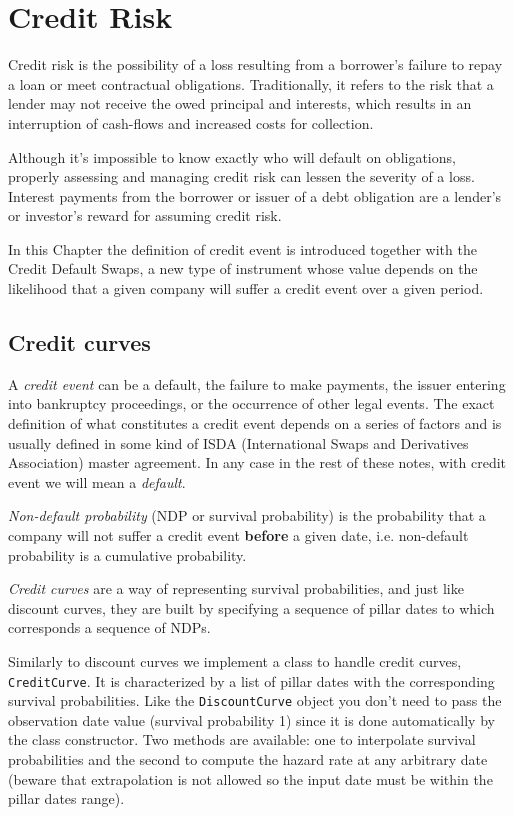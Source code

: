 \chapter{Credit Risk}\label{credit_default_swaps}

Credit risk is the possibility of a loss resulting from a borrower's failure to repay a loan or meet contractual obligations. Traditionally, it refers to the risk that a lender may not receive the owed principal and interests, which results in an interruption of cash-flows and increased costs for collection. 

Although it's impossible to know exactly who will default on obligations, properly assessing and managing credit risk can lessen the severity of a loss. Interest payments from the borrower or issuer of a debt obligation are a lender's or investor's reward for assuming credit risk.

In this Chapter the definition of credit event is introduced together with the Credit Default Swaps, a new type of instrument whose value depends on the likelihood that a given company will suffer a credit event over a given period.

\section{Credit curves}
\label{credit-curves}

A \emph{credit event} can be a default, the failure to make payments, the issuer entering into bankruptcy proceedings, or the occurrence of other legal events. The exact definition of what constitutes a credit event depends on a series of factors and is usually defined in some kind of ISDA (International Swaps and Derivatives Association) master agreement. In any case in the rest of these notes, with credit event we will mean a \emph{default}.

\emph{Non-default probability} (NDP or survival probability) is the probability that a company will not suffer a credit event \textbf{before} a given date, i.e. non-default probability is a cumulative probability.

\emph{Credit curves} are a way of representing survival probabilities, and just like discount curves, they are built by specifying a sequence of pillar dates to which corresponds a sequence of NDPs. 

\begin{finmarkets}
	Similarly to discount curves we implement a class to handle credit curves, \texttt{CreditCurve}. It is characterized by a list of pillar dates with the corresponding survival probabilities. Like the \texttt{DiscountCurve} object you don't need to pass the observation date value (survival probability 1) since it is done automatically by the class constructor. Two methods are available: one to interpolate survival probabilities and the second to compute the hazard rate at any arbitrary date (beware that extrapolation is not allowed so the input date must be within the pillar dates range).
\end{finmarkets}

